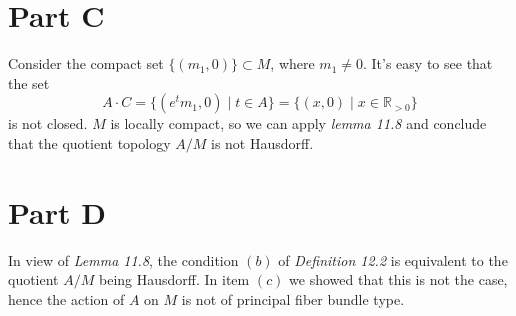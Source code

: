 \documentclass[]{article}
\begin{document}
\section{Part C}
Consider the compact set $\{ (m_1, 0) \} \subset M $, where $m_1 \neq 0$. It's easy to see that the set $$ A \cdot C = \{(e^t m_1,0) \mid t\in A\} = \{(x,0) \mid x\in \mathbb{R}_{>0} \} $$ is not closed. $M$ is locally compact, so we can apply \emph{lemma 11.8} and conclude that the quotient topology $A / M$ is not Hausdorff.


\section{Part D}

In view of \emph{Lemma 11.8}, the condition $(b)$ of \emph{Definition 12.2} is equivalent to the quotient $A / M$ being Hausdorff. In item $(c)$ we showed that this is not the case, hence the action of $A$ on $M$ is not of principal fiber bundle type. 
\end{document}
